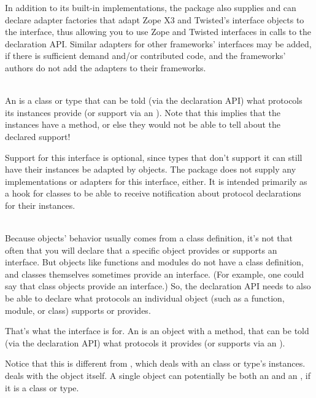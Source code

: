 \begin{verbatim%
}
\begin{verbatim%
}
\begin{verbatim%
}
\begin{verbatim%
}
\begin{verbatim%
}
\begin{verbatim%
}
\begin{description}
In addition to its built-in implementations, the  package
also supplies and can declare adapter factories that adapt Zope X3 and Twisted's
interface objects to the  interface, thus allowing
you to use Zope and Twisted interfaces in calls to the declaration API.  Similar
adapters for other frameworks' interfaces may be added, if there is sufficient
demand and/or contributed code, and the frameworks' authors do not add the
adapters to their frameworks.


\item[IOpenImplementor] \hfill \\
An  is a class or type that can be told (via the
declaration API) what protocols its instances provide (or support via an
).  Note that this implies that the instances have
a  method, or else they would not be able to tell
 about the declared support!

Support for this interface is optional, since types that don't support it
can still have their instances be adapted by  objects.
The  package does not supply any implementations or adapters
for this interface, either.  It is intended primarily as a hook for classes
to be able to receive notification about protocol declarations for their
instances.


\item[IOpenProvider] \hfill \\
Because objects' behavior usually comes from a class definition, it's not that
often that you will declare that a specific object provides or supports an
interface.  But objects like functions and modules do not have a class
definition, and classes themselves sometimes provide an interface.  (For
example, one could say that class objects provide an  interface.)
So, the declaration API needs to also be able to declare what protocols an
individual object (such as a function, module, or class) supports or provides.

That's what the  interface is for.  An
 is an object with a  method, that can
be told (via the declaration API) what protocols it provides (or supports via
an ).

Notice that this is different from , which deals with
an class or type's instances.   deals with the object
itself.  A single object can potentially be both an  and an
, if it is a class or type.


\end{description}
\end{verbatim%
}
\end{verbatim%
}
\end{verbatim%
}
\end{verbatim%
}
\end{verbatim%
}
\end{verbatim%
}
